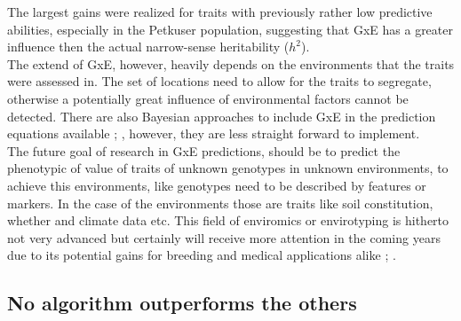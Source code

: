 The largest gains were realized for traits with previously rather low predictive
abilities, especially in the Petkuser population, suggesting that GxE has a greater
influence then the actual narrow-sense heritability ($h^2$). \\
The extend of GxE, however, heavily depends on the environments that the traits were
assessed in. The set of locations need to allow for the traits to segregate,
otherwise a potentially great influence of environmental factors cannot be detected. There
are also Bayesian approaches to include GxE in the prediction equations available
\cite{cuevas2017bayesian}; \cite{crossa2019deep}, however, they are less straight forward
to implement. \\
The future goal of research in GxE predictions, should be to predict the phenotypic of
value of traits of unknown genotypes in unknown environments, to achieve this environments,
like genotypes need to be described by features or markers. In the case of the
environments those are traits like soil constitution, whether and climate data etc. This
field of enviromics or envirotyping is hitherto not very advanced but certainly will
receive more attention in the coming years due to its potential gains for breeding and
medical applications alike \cite{resende2019enviromics}; \cite{chang2019envirotyping}.


\subsection{No algorithm outperforms the others}

